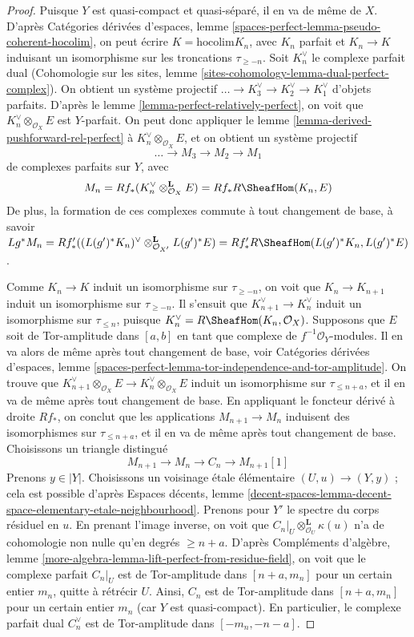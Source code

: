 \begin{proof}
Puisque $Y$ est quasi-compact et quasi-séparé, il en va de même de $X$.
D'après Catégories dérivées d'espaces, lemme
\ref{spaces-perfect-lemma-pseudo-coherent-hocolim}, on peut écrire
$K = \text{hocolim} K_n$, avec $K_n$ parfait et $K_n \to K$ induisant
un isomorphisme sur les troncations $\tau_{\geq -n}$. Soit $K_n^\vee$
le complexe parfait dual
(Cohomologie sur les sites, lemme \ref{sites-cohomology-lemma-dual-perfect-complex}).
On obtient un système projectif $\ldots \to K_3^\vee \to K_2^\vee \to K_1^\vee$
d'objets parfaits. D'après le lemme \ref{lemma-perfect-relatively-perfect},
on voit que $K_n^\vee \otimes_{\mathcal{O}_X} E$ est $Y$-parfait.
On peut donc appliquer le lemme \ref{lemma-derived-pushforward-rel-perfect}
à $K_n^\vee \otimes_{\mathcal{O}_X} E$, et on obtient un système projectif
$$
\ldots \to M_3 \to M_2 \to M_1
$$
de complexes parfaits sur $Y$, avec
$$
M_n = Rf_*(K_n^\vee \otimes_{\mathcal{O}_X}^\mathbf{L} E) =
Rf_*R\SheafHom(K_n, E)
$$
De plus, la formation de ces complexes commute à tout
changement de base, à savoir $Lg^*M_n =
Rf'_*((L(g')^*K_n)^\vee \otimes_{\mathcal{O}_{X'}}^\mathbf{L} L(g')^*E) =
Rf'_*R\SheafHom(L(g')^*K_n, L(g')^*E)$.

\medskip\noindent
Comme $K_n \to K$ induit un isomorphisme sur $\tau_{\geq -n}$, on voit que
$K_n \to K_{n + 1}$ induit un isomorphisme sur $\tau_{\geq -n}$.
Il s'ensuit que $K_{n + 1}^\vee \to K_n^\vee$
induit un isomorphisme sur $\tau_{\leq n}$, puisque
$K_n^\vee = R\SheafHom(K_n, \mathcal{O}_X)$.
Supposons que $E$ soit de Tor-amplitude dans $[a, b]$ en tant que complexe
de $f^{-1}\mathcal{O}_Y$-modules. Il en va alors de même après
tout changement de base, voir
Catégories dérivées d'espaces, lemme
\ref{spaces-perfect-lemma-tor-independence-and-tor-amplitude}.
On trouve que
$K_{n + 1}^\vee \otimes_{\mathcal{O}_X} E \to
K_n^\vee \otimes_{\mathcal{O}_X} E$
induit un isomorphisme sur $\tau_{\leq n + a}$,
et il en va de même après tout changement de base.
En appliquant le foncteur dérivé à droite $Rf_*$,
on conclut que les applications $M_{n + 1} \to M_n$
induisent des isomorphismes sur $\tau_{\leq n + a}$,
et il en va de même après tout changement de base.
Choisissons un triangle distingué
$$
M_{n + 1} \to M_n \to C_n \to M_{n + 1}[1]
$$
Prenons $y \in |Y|$. Choisissons un voisinage \'etale élémentaire
$(U, u) \to (Y, y)$ ; cela est possible d'après
Espaces décents, lemme
\ref{decent-spaces-lemma-decent-space-elementary-etale-neighbourhood}.
Prenons pour $Y'$ le spectre du corps résiduel en $u$.
En prenant l'image inverse, on voit que $C_n|_U \otimes_{\mathcal{O}_U}^\mathbf{L} \kappa(u)$
n'a de cohomologie non nulle qu'en degrés $\geq n + a$. D'après
Compléments d'algèbre, lemme
\ref{more-algebra-lemma-lift-perfect-from-residue-field},
on voit que le complexe parfait $C_n|_U$ est de Tor-amplitude dans
$[n + a, m_n]$ pour un certain entier $m_n$, quitte à rétrécir $U$.
Ainsi, $C_n$ est de Tor-amplitude dans $[n + a, m_n]$ pour un certain entier $m_n$
(car $Y$ est quasi-compact).
En particulier, le complexe parfait dual $C_n^\vee$ est de Tor-amplitude dans
$[-m_n, -n - a]$.


\end{proof}
